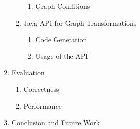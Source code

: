 \begin{enumerate}
\begin{enumerate}
\begin{enumerate}
					\item Graph Conditions
				\end{enumerate}
			\item Java API for Graph Transformations
				\begin{enumerate}
					\item Code Generation
					\item Usage of the API
				\end{enumerate}
		\end{enumerate}
	\item Evaluation
		\begin{enumerate}
			\item Correctness
			\item Performance
		\end{enumerate}
	\item Conclusion and Future Work
\end{enumerate}

